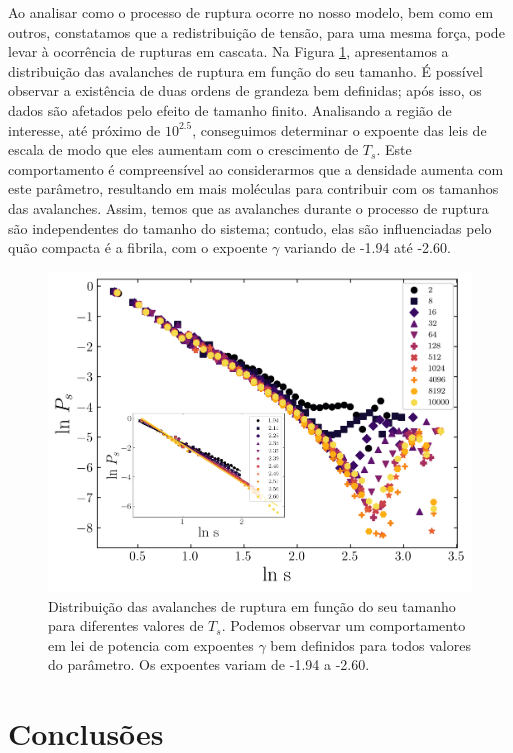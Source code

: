 \documentclass{article}
\begin{document}
Ao analisar como o processo de ruptura ocorre no nosso modelo, bem como em outros, constatamos que a 
redistribuição de tensão, para uma mesma força, pode levar à ocorrência de rupturas em cascata. Na Figura 
\ref{R7}, apresentamos a distribuição das avalanches de ruptura em função do seu tamanho. É possível observar a 
existência de duas ordens de grandeza bem definidas; após isso, os dados são afetados pelo efeito de tamanho 
finito. Analisando a região de interesse, até próximo de \(10^{2.5}\), conseguimos determinar o expoente das leis 
de escala de modo que eles aumentam com o crescimento de \(T_{s}\). Este comportamento é compreensível ao 
considerarmos que a densidade aumenta com este parâmetro, resultando em mais moléculas para contribuir com os 
tamanhos das avalanches. Assim, temos que as avalanches durante o processo de ruptura são independentes do tamanho 
do sistema; contudo, elas são influenciadas pelo quão compacta é a fibrila, com o expoente \(\gamma\) variando de 
-1.94 até -2.60. 


\begin{figure}[H]
    \centering
    \includegraphics[width=\textwidth]{figures/ava.png}

    \caption{Distribuição das avalanches de ruptura em função do seu tamanho para diferentes valores de $T_{s}$.
    Podemos observar um comportamento em lei de potencia com expoentes $\gamma$ bem definidos para todos valores do 
    parâmetro. Os expoentes variam de -1.94 a -2.60.} 

    \label{R7}

\end{figure}

\section*{Conclusões}









    
\end{document}
